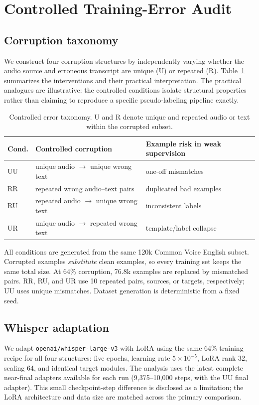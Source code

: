 \documentclass[conference]{IEEEtran}
\begin{document}
\section{Controlled Training-Error Audit}
\subsection{Corruption taxonomy}
We construct four corruption structures by independently varying whether the
audio source and erroneous transcript are unique (U) or repeated (R).
Table~\ref{tab:taxonomy} summarizes the interventions and their practical
interpretation. The practical analogues are illustrative: the controlled
conditions isolate structural properties rather than claiming to reproduce a
specific pseudo-labeling pipeline exactly.

\begin{table}[t]
\centering
\caption{Controlled error taxonomy. U and R denote unique and repeated audio or
text within the corrupted subset.}
\label{tab:taxonomy}
\scriptsize
\setlength{\tabcolsep}{3.2pt}
\begin{tabular}{lll}
\toprule
Cond. & Controlled corruption & Example risk in weak supervision \\
\midrule
UU & unique audio $\rightarrow$ unique wrong text & one-off mismatches \\
RR & repeated wrong audio--text pairs & duplicated bad examples \\
RU & repeated audio $\rightarrow$ unique wrong text & inconsistent labels \\
UR & unique audio $\rightarrow$ repeated wrong text & template/label collapse \\
\bottomrule
\end{tabular}
\end{table}

All conditions are generated from the same 120k Common Voice English subset.
Corrupted examples \emph{substitute} clean examples, so every training set keeps
the same total size. At 64\% corruption, 76.8k examples are replaced by
mismatched pairs. RR, RU, and UR use 10 repeated pairs, sources, or targets,
respectively; UU uses unique mismatches. Dataset generation is deterministic
from a fixed seed.

\subsection{Whisper adaptation}
We adapt \texttt{openai/whisper-large-v3} with LoRA using the same 64\%
training recipe for all four structures: five epochs, learning rate
$5\times10^{-5}$, LoRA rank 32, scaling 64, and identical target modules. The
analysis uses the latest complete near-final adapters available for each run
(9,375--10,000 steps, with the UU final adapter). This small checkpoint-step
difference is disclosed as a limitation; the LoRA architecture and data size
are matched across the primary comparison.
\end{document}
